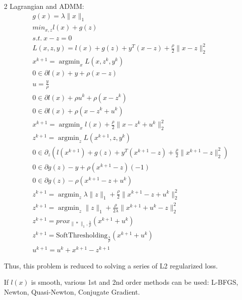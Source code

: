 \documentclass[8pt]{extarticle}
\DeclareMathOperator*{\argmin}{argmin}
\newcommand{\norm}[1]{\|#1\|}
\begin{document}
\begin{multicols*}{2}
  Lagrangian and ADMM:
  \begin{align*}
    &g(x)=\lambda \norm{x}_1\\
    &min_{x,z} l(x) + g(z)\\
    &s.t.\ x-z=0\\
    &L(x,z,y) = l(x) + g(z) + y^T (x-z)+\frac{\rho}{2}\norm{x-z}_2^2\\
    &x^{k+1}=\argmin_x L(x, z^k, y^k)\\
    &0 \in \partial l(x) + y + \rho(x-z)\\
    &u=\frac{y}{\rho}\\
    &0 \in \partial l(x) + \rho u^k + \rho(x-z^k)\\
    &0 \in \partial l(x) + \rho(x-z^k+u^k)\\
    &x^{k+1}=\argmin_x l(x) + \frac{\rho}{2}\norm{x-z^k+u^k}_2^2\\
    &z^{k+1}=\argmin_z L(x^{k+1}, z, y^k)\\
    &0 \in \partial_z (l(x^{k+1}) + g(z) + y^T(x^{k+1}-z) + \frac{\rho}{2}\norm{x^{k+1}-z}_2^2)\\
    &0 \in \partial g(z) - y + \rho (x^{k+1}-z)(-1)\\
    &0 \in \partial g(z) - \rho(x^{k+1}-z+u^k)\\
    &z^{k+1}=\argmin_z \lambda \norm{z}_1 + \frac{\rho}{2}\norm{x^{k+1}-z+u^k}_2^2\\
    &z^{k+1}=\argmin_z \norm{z}_1 + \frac{\rho}{2\lambda}\norm{x^{k+1}+u^k-z}_2^2\\
    &z^{k+1}=prox_{\norm{*}_1, \frac{\lambda}{\rho}}(x^{k+1}+u^k)\\
    &z^{k+1}=\text{SoftThresholding}_{\frac{\lambda}{\rho}}(x^{k+1}+u^k)\\
    &u^{k+1} = u^k + x^{k+1} - z^{k+1}
  \end{align*}

  Thus, this problem is reduced to solving a series of L2 regularized loss.

  If $l(x)$ is smooth, various 1st and 2nd order methods can be used: L-BFGS, Newton, Quasi-Newton, Conjugate Gradient.

  \vfill\null
  \columnbreak
  

\end{multicols*}
\end{document}
